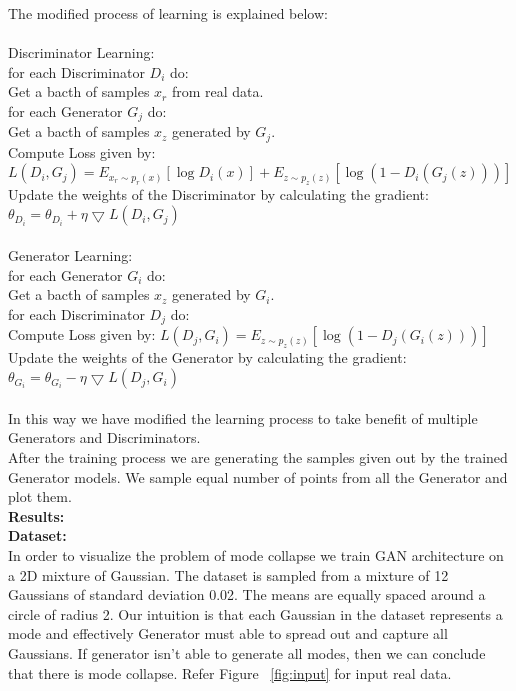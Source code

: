 \documentclass[12pt]{article}
\begin{document}
\noindent The modified process of learning is explained below:\\\\
Discriminator Learning:\\
for each Discriminator $D_i$ do:\\
\indent Get a bacth of samples $x_r$ from real data.\\
\indent for each Generator $G_j$ do:\\
\indent \indent Get a bacth of samples $x_z$ generated by $G_j$.\\
\indent \indent Compute Loss given by: $L(D_i,G_j) = E_{x_r \sim p_r(x)}[\log D_i(x)] + E_{z \sim p_z(z)}[\log (1-D_i(G_j(z)))]$\\
\indent \indent Update the weights of the Discriminator by calculating the gradient:\\
\indent \indent  $\theta_{D_i} = \theta_{D_i} + \eta \bigtriangledown L(D_i,G_j)$\\\\

\noindent Generator Learning:\\
for each Generator $G_i$ do:\\
\indent Get a bacth of samples $x_z$ generated by $G_i$.\\
\indent for each Discriminator $D_j$ do:\\
\indent \indent Compute Loss given by: $L(D_j,G_i) = E_{z \sim p_z(z)}[\log (1-D_j(G_i(z)))]$\\
\indent \indent Update the weights of the Generator by calculating the gradient:\\
\indent \indent $\theta_{G_i} = \theta_{G_i} - \eta \bigtriangledown L(D_j,G_i)$\\\\
\noindent In this way we have modified the learning process to take benefit of multiple Generators and Discriminators.\\
 
After the training process we are generating the samples given out by the trained Generator models. We sample equal number of points from all the Generator and plot them.\\

\noindent\textbf{Results:}\\

\noindent\textbf{Dataset:}\\
In order to visualize the problem of mode collapse we train GAN architecture on a 2D mixture of Gaussian. The dataset is sampled from a mixture of 12 Gaussians of standard deviation 0.02. The means are equally spaced around a circle of radius 2. Our intuition is that each Gaussian in the dataset represents a mode and effectively Generator must able to spread out and capture all Gaussians. If generator isn’t able to generate all modes, then we can conclude that there is mode collapse. Refer Figure ~\ref{fig:input} for input real data.\\
\end{document}

